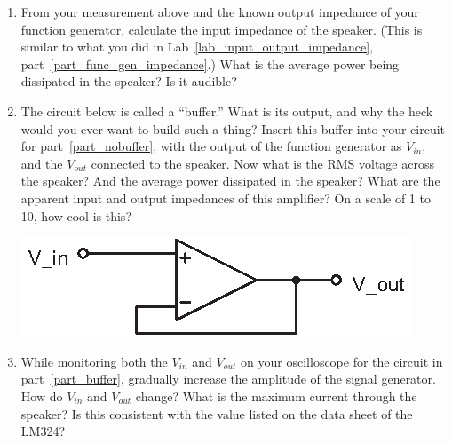 \begin{enumerate}[wide]
\item From your measurement above and the known output impedance of your function generator, calculate the input impedance of the speaker.  (This is similar to what you did in Lab~\ref{lab_input_output_impedance}, part~\ref{part_func_gen_impedance}.)  What is the average power being dissipated in the speaker?  Is it audible? \label{part_nobuffer}

\item The circuit below is called a ``buffer.'' What is its output, and why the heck would you ever want to build such a thing?  Insert this buffer into your circuit for part~\ref{part_nobuffer}, with the output of the function generator as $V_{in}$, and the $V_{out}$ connected to the speaker.  Now what is the RMS voltage across the speaker?  And the average power dissipated in the speaker?  What are the apparent input and output impedances of this amplifier?  On a scale of 1 to 10, how cool is this? \label{part_buffer}
\begin{center}
\includegraphics{op-amps/buffer.eps}
\end{center}


\item While monitoring both the $V_{in}$ and $V_{out}$ on your oscilloscope for the circuit in part~\ref{part_buffer}, gradually increase the amplitude of the signal generator.  How do $V_{in}$ and $V_{out}$ change?  What is the maximum current through the speaker?  Is this consistent with the value listed on the data sheet of the LM324? 

\bigskip


\end{enumerate}
